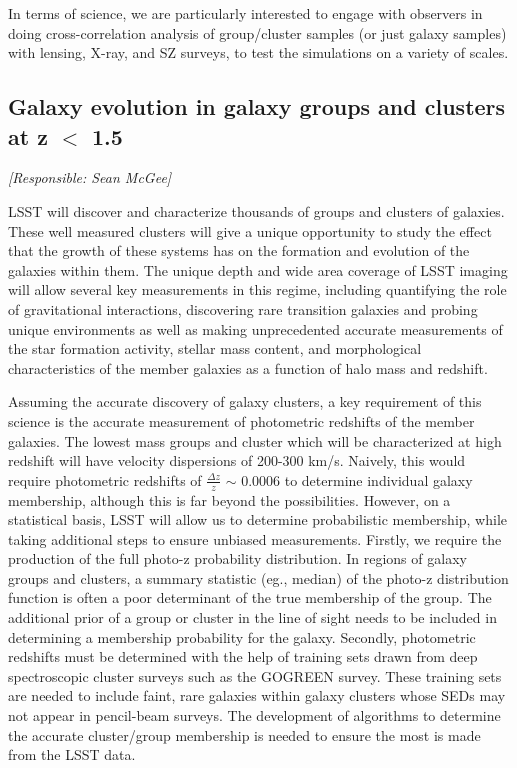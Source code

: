 \documentclass[a4paper,11pt]{article}
\begin{document}
In terms of science, we are particularly interested to engage with observers in doing cross-correlation analysis of group/cluster samples (or just galaxy samples) with lensing, X-ray, and SZ surveys, to test the simulations on a variety of scales.   



\subsection{Galaxy evolution in galaxy groups and clusters at z $<$ 1.5} \label{sec:galevo}

{\it [Responsible: Sean McGee]}

LSST will discover and characterize thousands of groups and clusters of galaxies. These well measured clusters will give a unique opportunity to study the effect that the growth of these systems has on the formation and evolution of the galaxies within them. The unique depth and wide area coverage of LSST imaging will allow several key measurements in this regime, including quantifying the role of gravitational interactions, discovering rare transition galaxies and probing unique environments as well as making unprecedented accurate measurements of the star formation activity, stellar mass content, and morphological characteristics of the member galaxies as a function of halo mass and redshift. 

Assuming the accurate discovery of galaxy clusters, a key requirement of this science is the accurate measurement of photometric redshifts of the member galaxies. The lowest mass groups and cluster which will be characterized at high redshift will have velocity dispersions of 200-300 km/s. Naively, this would require photometric redshifts of $\frac{\Delta z}{z}$ $\sim$ 0.0006 to determine individual galaxy membership, although this is far beyond the possibilities. However, on a statistical basis, LSST will allow us to determine probabilistic membership, while taking additional steps to ensure unbiased measurements. Firstly, we require the production of the full photo-z probability distribution. In regions of galaxy groups and clusters, a summary statistic (eg., median) of the photo-z distribution function is often a poor determinant of the true membership of the group. The additional prior of a group or cluster in the line of sight needs to be included in determining a membership probability for the galaxy. Secondly, photometric redshifts must be determined with the help of training sets drawn from deep spectroscopic cluster surveys such as the GOGREEN survey. These training sets are needed to include faint, rare galaxies within galaxy clusters whose SEDs may not appear in pencil-beam surveys. The development of algorithms to determine the accurate cluster/group membership is needed to ensure the most is made from the LSST data.
\end{document}
